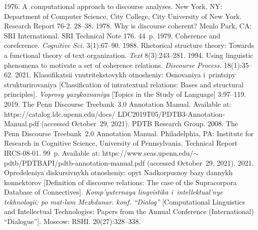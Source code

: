   \begin{multicols}{2}

\renewcommand{\bibname}{\protect\rmfamily References}

{\small\frenchspacing
 {%
 \begin{thebibliography}{99}

 1976. A~computational approach to discourse analyses. New York, NY: 
Department of Computer Science, City College, City University of New York. Research Report 76-2. 
28--38.
 1978. Why is discourse coherent? Menlo Park, CA: SRI International. SRI 
Technical Note 176. 44~p.
 1979. Coherence and coreference. \textit{Cognitive Sci.} 3(1):67--90.
 1988. Rhetorical structure theory: Towards a functional 
theory of text organization.
\textit{Text} 8(3):243--281.
 1994. Using linguistic phenomena to motivate a set of coherence relations. 
\textit{Discourse Process.}
 18(1):35--62.
 2021. Klassifikatsii vnutritekstovykh otnosheniy: Osnovaniya i~printsipy 
strukturirovaniya [Classification of intratextual relations: Bases and structural principles]. \textit{Voprosy 
yazykoznaniya} [Topics in the Study of Language] 3:97--119.
 2019. The Penn Discourse Treebank~3.0 
Annotation Manual. Available at: {\sf https://catalog.ldc.upenn.edu/docs/
LDC2019T05/PDTB3-Annotation-Manual.pdf} (accessed October~29, 2021).
PDTB Research Group. 2008. The Penn Discourse Treebank~2.0 Annotation Manual. Philadelphia, PA: 
Institute for Research in Cognitive Science, University of Pennsylvania. Technical Report IRCS-08-01. 
99~p. Available at: {\sf   
https://www.seas.upenn.edu/$\sim$pdtb/PDTBAPI/pdtb-annotation-manual.pdf} (accessed October~29, 
2021).
 2021. Opredeleniya diskursivnykh otnosheniy: opyt Nadkorpusnoy bazy dannykh 
konnektorov [Definition of discourse relations: The case of the Supracorpora Database of Connectives]. 
\textit{Komp'yuternaya lingvistika i~intellektual'nye tekhnologii: po mat-lam Mezhdunar. konf. 
``Dialog''} [Computational Linguistics and Intellectual Technologies: Papers from the Annual Conference 
(International) ``Dialogue'']. Moscow: RSHI. 20(27):328--338.

\end{thebibliography}}}
\end{multicols}
